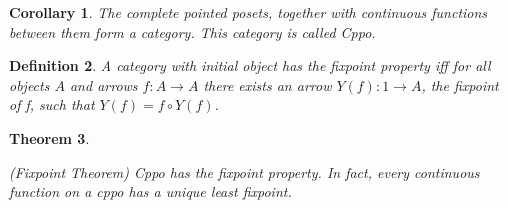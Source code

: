 \documentclass[a4paper]{article}
\newcommand{\arr}{\rightarrow}
\newtheorem{definition}{Definition}[section]
\newtheorem{theorem}[definition]{Theorem}
\newtheorem{corollary}[definition]{Corollary}
\begin{document}
\begin{corollary}

The complete pointed posets, together with continuous functions between them form
a category.  This category is called Cppo.

\end{corollary}


\begin{definition}

A category with initial object has the \emph{fixpoint property} iff for all objects $A$ and arrows
$f : A \arr A$ there exists an arrow $Y(f) : 1 \arr A$, the fixpoint of f, such
that $Y(f) = f \circ Y(f)$.

\begin{center}
\end{center}

\end{definition}


\begin{theorem} \label{thmFixpoint}

(Fixpoint Theorem) Cppo has the fixpoint property. In fact, every continuous
function on a cppo has a unique least fixpoint.

\end{theorem}
\end{document}
